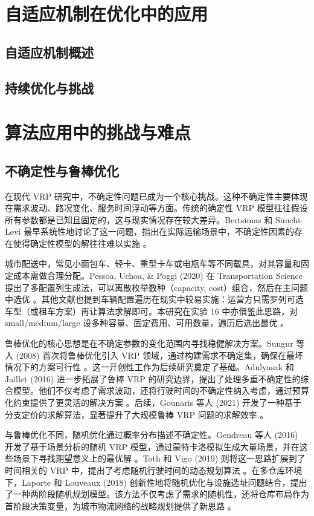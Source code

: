 \documentclass[12pt,a4paper,twoside]{ctexbook}
\begin{document}
\section{自适应机制在优化中的应用}

\subsection{自适应机制概述}

\subsection{持续优化与挑战}

\section{算法应用中的挑战与难点}

\subsection{不确定性与鲁棒优化}
在现代 VRP 研究中，不确定性问题已成为一个核心挑战。这种不确定性主要体现在需求波动、路况变化、服务时间浮动等方面。传统的确定性 VRP 模型往往假设所有参数都是已知且固定的，这与现实情况存在较大差异。Bertsimas 和 Simchi-Levi 最早系统性地讨论了这一问题，指出在实际运输场景中，不确定性因素的存在使得确定性模型的解往往难以实施 \cite{1}。

城市配送中，常见小面包车、轻卡、重型卡车或电瓶车等不同载具，对其容量和固定成本需做合理分配。Pessoa, Uchoa, \& Poggi (2020) 在 Transportation Science 提出了多配置列生成法，可以离散枚举数种（capacity, cost）组合，然后在主问题中选优 \cite{15}。其他文献也提到车辆配置遍历在现实中较易实施：运营方只需罗列可选车型（或租车方案）再让算法求解即可。本研究在实验 16 中亦借鉴此思路，对 small/medium/large 设多种容量、固定费用、可用数量，遍历后选出最优 \cite{7}。

鲁棒优化的核心思想是在不确定参数的变化范围内寻找稳健解决方案。Sungur 等人 (2008) 首次将鲁棒优化引入 VRP 领域，通过构建需求不确定集，确保在最坏情况下的方案可行性 \cite{2}。这一开创性工作为后续研究奠定了基础。Adulyasak 和 Jaillet (2016) 进一步拓展了鲁棒 VRP 的研究边界，提出了处理多重不确定性的综合模型。他们不仅考虑了需求波动，还将行驶时间的不确定性纳入考虑，通过预算化约束提供了更灵活的解决方案 \cite{3}。后续，Gounaris 等人 (2021) 开发了一种基于分支定价的求解算法，显著提升了大规模鲁棒 VRP 问题的求解效率 \cite{4}。

与鲁棒优化不同，随机优化通过概率分布描述不确定性。Gendreau 等人 (2016) 开发了基于场景分析的随机 VRP 模型，通过蒙特卡洛模拟生成大量场景，并在这些场景下寻找期望意义上的最优解 \cite{5}。Toth 和 Vigo (2019) 则将这一思路扩展到了时间相关的 VRP 中，提出了考虑随机行驶时间的动态规划算法 \cite{6}。在多仓库环境下，Laporte 和 Louveaux (2018) 创新性地将随机优化与设施选址问题结合，提出了一种两阶段随机规划模型。该方法不仅考虑了需求的随机性，还将仓库布局作为首阶段决策变量，为城市物流网络的战略规划提供了新思路 \cite{7}。
\end{document}
